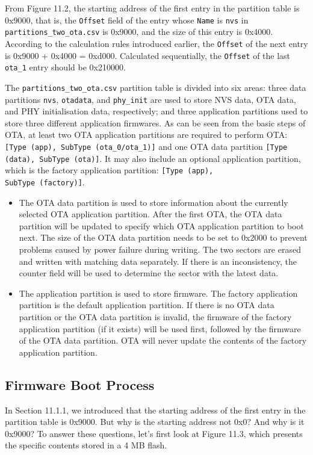 \documentclass[a4paper,12pt,openany]{book}
\begin{document}
From Figure 11.2, the starting address of the first entry in the partition table is 0x9000, that is, the \verb|Offset| field of the entry whose \verb|Name| is \verb|nvs| in \verb|partitions_two_ota.csv| is 0x9000, and the size of this entry is 0x4000. According to the calculation rules introduced earlier, the \verb|Offset| of the next entry is 0x9000 + 0x4000 = 0xd000. Calculated sequentially, the \verb|Offset| of the last \verb|ota_1| entry should be 0x210000.

The \verb|partitions_two_ota.csv| partition table is divided into six areas: three data partitions \verb|nvs|, \verb|otadata|, and \verb|phy_init| are used to store NVS data, OTA data, and PHY initialisation data, respectively; and three application partitions used to store three different application firmwares. As can be seen from the basic steps of OTA, at least two OTA application partitions are required to perform OTA: \verb|[Type (app), SubType (ota_0/ota_1)]| and one OTA data partition \verb|[Type (data), SubType (ota)]|. It may also include an optional application partition, which is the factory application partition: \verb|[Type (app), |\\ \verb|SubType (factory)]|.

\begin{itemize}[leftmargin=1em]
    \item The OTA data partition is used to store information about the currently selected OTA application partition. After the first OTA, the OTA data partition will be updated to specify which OTA application partition to boot next. The size of the OTA data partition needs to be set to 0x2000 to prevent problems caused by power failure during writing. The two sectors are erased and written with matching data separately. If there is an inconsistency, the counter field will be used to determine the sector with the latest data.
    \item The application partition is used to store firmware. The factory application partition is the default application partition. If there is no OTA data partition or the OTA data partition is invalid, the firmware of the factory application partition (if it exists) will be used first, followed by the firmware of the OTA data partition. OTA will never update the contents of the factory application partition.
\end{itemize}

\subsection{Firmware Boot Process}
In Section 11.1.1, we introduced that the starting address of the first entry in the partition table is 0x9000. But why is the starting address not 0x0? And why is it 0x9000? To answer these questions, let's first look at Figure 11.3, which presents the specific contents stored in a 4 MB flash.
\end{document}

